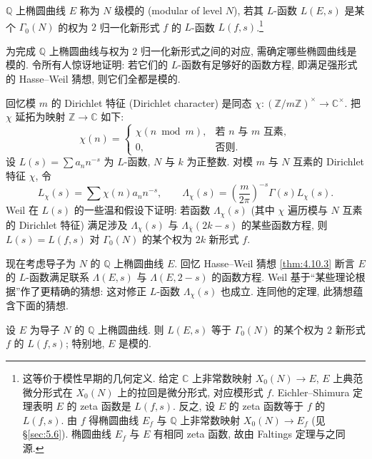 \begin{definition} \label{thm:5.5.3} 
$\mathbb{Q}$ 上椭圆曲线 $E$ 称为 $N$ 级模的 (modular of level $N$), 若其 $L$-函数 $L(E, s)$ 是某个 $\Gamma_0(N)$ 的权为 $2$ 归一化新形式 $f$ 的 $L$-函数 $L(f, s)$.\footnote{这等价于模性早期的几何定义. 给定 $\mathbb{C}$ 上非常数映射 $X_0(N)\to E$, $E$ 上典范微分形式在 $X_0(N)$ 上的拉回是微分形式, 对应模形式 $f$. Eichler--Shimura 定理表明 $E$ 的 zeta 函数是 $L(f, s)$. 反之, 设 $E$ 的 zeta 函数等于 $f$ 的 $L(f, s)$. 由 $f$ 得椭圆曲线 $E_f$ 与 $\mathbb{Q}$ 上非常数映射 $X_0(N)\to E_f$ (见 \S\ref{sec:5.6}). 椭圆曲线 $E_f$ 与 $E$ 有相同 zeta 函数, 故由 Faltings 定理与之同源.}
\end{definition}

为完成 $\mathbb{Q}$ 上椭圆曲线与权为 $2$ 归一化新形式之间的对应, 需确定哪些椭圆曲线是模的. \cite{weil1967} 令所有人惊讶地证明: 若它们的 $L$-函数有足够好的函数方程, 即满足强形式的 Hasse--Weil 猜想, 则它们全都是模的.

回忆模 $m$ 的 Dirichlet 特征 (Dirichlet character) 是同态 $\chi\colon(\mathbb{Z}/m\mathbb{Z})^{\times}\to\mathbb{C}^{\times}$. 把 $\chi$ 延拓为映射 $\mathbb{Z}\to\mathbb{C}$ 如下:
\[
\chi(n) = \begin{cases} \chi(n\bmod m), & \text{若 } n \text{ 与 } m \text{ 互素},\\ 0, & \text{否则}. \end{cases}
\]
设 $L(s) = \sum a_nn^{-s}$ 为 $L$-函数, $N$ 与 $k$ 为正整数. 对模 $m$ 与 $N$ 互素的 Dirichlet 特征 $\chi$, 令
\[
L_\chi(s) = \sum\chi(n)a_nn^{-s}, \qquad
\Lambda_\chi(s) = \left(\frac{m}{2\pi}\right)^{-s}\Gamma(s)L_\chi(s).
\]
Weil 在 $L(s)$ 的一些温和假设下证明: 若函数 $\Lambda_\chi(s)$ (其中 $\chi$ 遍历模与 $N$ 互素的 Dirichlet 特征) 满足涉及 $\Lambda_\chi(s)$ 与 $\Lambda_{\bar{\chi}}(2k-s)$ 的某些函数方程, 则 $L(s) = L(f, s)$ 对 $\Gamma_0(N)$ 的某个权为 $2k$ 新形式 $f$.

现在考虑导子为 $N$ 的 $\mathbb{Q}$ 上椭圆曲线 $E$. 回忆 Hasse--Weil 猜想 \ref{thm:4.10.3} 断言 $E$ 的 $L$-函数满足联系 $\Lambda(E, s)$ 与 $\Lambda(E, 2-s)$ 的函数方程. Weil 基于``某些理论根据''作了更精确的猜想: 这对修正 $L$-函数 $\Lambda_\chi(s)$ 也成立. 连同他的定理, 此猜想蕴含下面的猜想.

\begin{conjecture} \label{thm:5.5.4} 
设 $E$ 为导子 $N$ 的 $\mathbb{Q}$ 上椭圆曲线. 则 $L(E, s)$ 等于 $\Gamma_0(N)$ 的某个权为 $2$ 新形式 $f$ 的 $L(f, s)$; 特别地, $E$ 是模的.
\end{conjecture}

